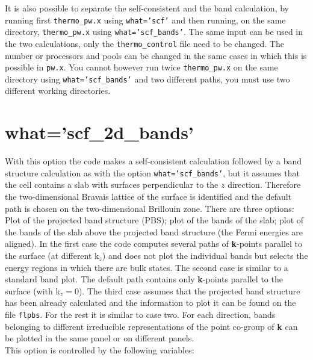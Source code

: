 \documentclass[12pt,a4paper,twoside]{report}
\begin{document}
It is also possible to separate the self-consistent and the band calculation,
by running first \texttt{thermo\_pw.x} using \texttt{what='scf'} and then
running, on the same directory, \texttt{thermo\_pw.x} using 
\texttt{what='scf\_bands'}. The same input can be used in the two 
calculations, only the \texttt{thermo\_control} file need to be changed. 
The number or processors and pools can be changed in the same cases in
which this is possible in \texttt{pw.x}.
You cannot however run twice \texttt{thermo\_pw.x} on the same 
directory using \texttt{what='scf\_bands'} and two different paths, you
must use two different working directories.

\newpage
{\color{coral}\section{what='scf\_2d\_bands'}}
\color{black}
With this option the code makes a self-consistent calculation followed
by a band structure calculation as with the option 
\texttt{what='scf\_bands'}, but it assumes 
that the cell contains a slab with surfaces perpendicular to the $z$ 
direction. Therefore the two-dimensional Bravais lattice of the surface 
is identified and the default path is chosen on the two-dimensional 
Brillouin zone. 
There are three options: Plot of the projected band structure (PBS); 
plot of the bands of the slab; plot of the bands of the slab above the
projected band structure (the Fermi energies are aligned). In the first 
case the code computes several paths
of {\bf k}-points parallel to the surface (at different k$_z$) and does 
not plot the individual bands but selects the energy regions in which 
there are bulk states. The second case is similar to a standard band plot. 
The default path contains only {\bf k}-points parallel to the 
surface (with k$_z=0$). The third case assumes that the projected band 
structure has been already calculated and the information to plot it 
can be found on the file \texttt{flpbs}. For the rest it is 
similar to case two. For each direction, bands belonging to different 
irreducible representations of the point co-group of {\bf k} can be plotted 
in the same panel or on different panels.\\
This option is controlled by the following variables:
\end{document}
